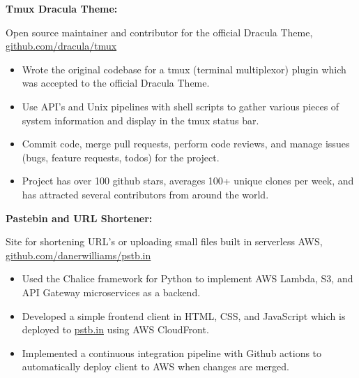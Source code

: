 \documentclass[letterpaper,10pt]{article}
\newcommand{\resumeItem}[2]{
  \item\small{
    {#1}{#2 \vspace{-2pt}}
  }
}
\newcommand{\resumeSubItem}[2]{\resumeItem{#1}{#2}\vspace{-4pt}}
\begin{document}
{      \resumeSubItem{\textbf{Tmux Dracula Theme: }}
      { Open source maintainer and contributor for the official Dracula Theme, \href{https://github.com/dracula/tmux}{github.com/dracula/tmux}
         \vspace{-5pt}
         \begin{itemize}
          \item Wrote the original codebase for a tmux (terminal multiplexor) plugin which was accepted to the official Dracula Theme.
          \vspace{-2pt}
          \item Use API's and Unix pipelines with shell scripts to gather various pieces of system information and display in the tmux status bar.
          \vspace{-2pt}
          \item Commit code, merge pull requests, perform code reviews, and manage issues (bugs, feature requests, todos) for the project.
          \vspace{-2pt}
          \item Project has over 100 github stars, averages 100+ unique clones per week, and has attracted several contributors from around the world.
         \end{itemize}
      }

     \vspace{-2pt}

      \resumeSubItem{\textbf{Pastebin and URL Shortener: }}
      { Site for shortening URL's or uploading small files built in serverless AWS, \href{https://github.com/danerwilliams/pstb.in}{github.com/danerwilliams/pstb.in}
         \vspace{-5pt}
         \begin{itemize}
            \item Used the Chalice framework for Python to implement AWS Lambda, S3, and API Gateway microservices as a backend.
            \vspace{-2pt}
            \item Developed a simple frontend client in HTML, CSS, and JavaScript which is deployed to \href{https://www.pstb.in}{pstb.in} using AWS CloudFront.
            \vspace{-2pt}
            \item Implemented a continuous integration pipeline with Github actions to automatically deploy client to AWS when changes are merged.
         \end{itemize}
      }

}
\end{document}
